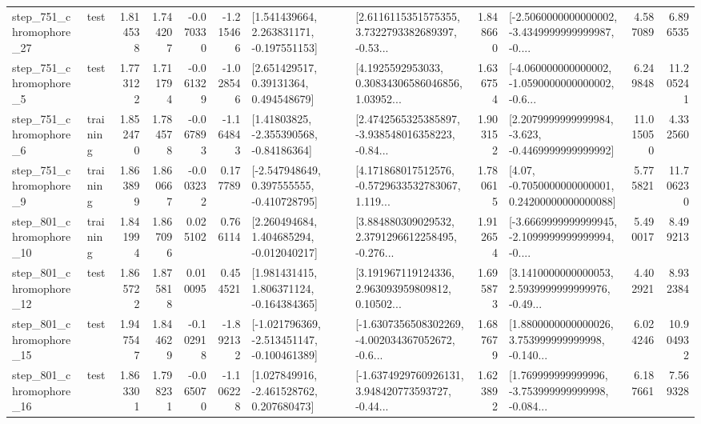\begin{tabular}{llrrrrllrlrr}
  step\_751\_chromophore\_27 &      test &      1.814538 &    1.744207 &     -0.070330 & -1.215466 &    [1.541439664, 2.263831171, -0.197551153] &  [2.6116115351575355, 3.7322793382689397, -0.53... &       1.848660 &  [-2.5060000000000002, -3.4349999999999987, -0.... &            4.587089 &          6.896535 \\
   step\_751\_chromophore\_5 &      test &      1.773122 &    1.711794 &     -0.061329 & -1.028546 &      [2.651429517, 0.39131364, 0.494548679] &  [4.1925592953033, 0.30834306586046856, 1.03952... &       1.636754 &  [-4.060000000000002, -1.0590000000000002, -0.6... &            6.249848 &         11.205241 \\
   step\_751\_chromophore\_6 &  training &      1.852470 &    1.784578 &     -0.067893 & -1.164843 &     [1.41803825, -2.355390568, -0.84186364] &  [2.4742565325385897, -3.938548016358223, -0.84... &       1.903152 &  [2.2079999999999984, -3.623, -0.4469999999999992] &           11.015050 &          4.332560 \\
   step\_751\_chromophore\_9 &  training &      1.863899 &    1.860667 &     -0.003232 &  0.177789 &   [-2.547948649, 0.397555555, -0.410728795] &  [4.171868017512576, -0.5729633532783067, 1.119... &       1.780615 &   [4.07, -0.7050000000000001, 0.24200000000000088] &            5.775821 &         11.706230 \\
  step\_801\_chromophore\_10 &  training &      1.841994 &    1.867096 &      0.025102 &  0.766114 &    [2.260494684, 1.404685294, -0.012040217] &  [3.884880309029532, 2.3791296612258495, -0.276... &       1.912654 &  [-3.6669999999999945, -2.1099999999999994, -0.... &            5.490017 &          8.499213 \\
  step\_801\_chromophore\_12 &      test &      1.865722 &    1.875818 &      0.010095 &  0.454521 &    [1.981431415, 1.806371124, -0.164384365] &  [3.191967119124336, 2.963093959809812, 0.10502... &       1.695873 &  [3.1410000000000053, 2.5939999999999976, -0.49... &            4.402921 &          8.932384 \\
  step\_801\_chromophore\_15 &      test &      1.947547 &    1.844629 &     -0.102918 & -1.892132 &  [-1.021796369, -2.513451147, -0.100461389] &  [-1.6307356508302269, -4.002034367052672, -0.6... &       1.687679 &  [1.8800000000000026, 3.753999999999998, -0.140... &            6.024246 &         10.904932 \\
  step\_801\_chromophore\_16 &      test &      1.863301 &    1.798231 &     -0.065070 & -1.106228 &    [1.027849916, -2.461528762, 0.207680473] &  [-1.6374929760926131, 3.948420773593727, -0.44... &       1.623892 &  [1.769999999999996, -3.753999999999998, -0.084... &            6.187661 &          7.569328 \\

\end{tabular}
